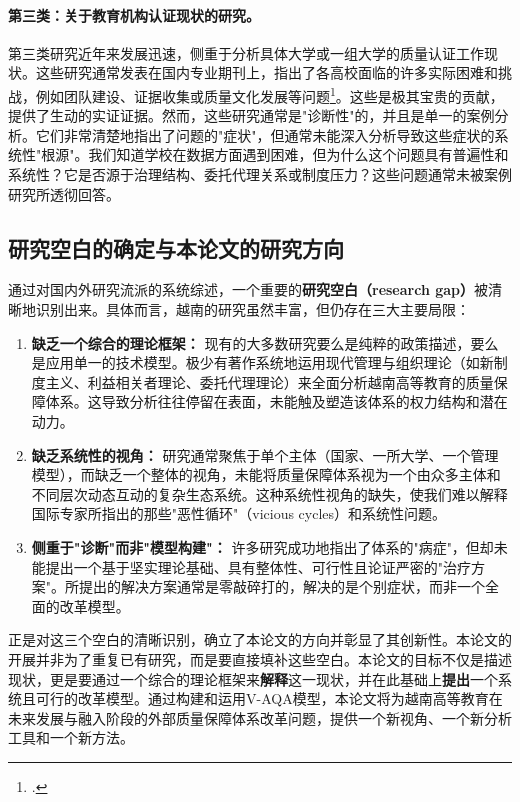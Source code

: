 \paragraph{第三类：关于教育机构认证现状的研究。}
第三类研究近年来发展迅速，侧重于分析具体大学或一组大学的质量认证工作现状。这些研究通常发表在国内专业期刊上，指出了各高校面临的许多实际困难和挑战，例如团队建设、证据收集或质量文化发展等问题\footcite{VJE_Challenges2023}。这些是极其宝贵的贡献，提供了生动的实证证据。然而，这些研究通常是"诊断性"的，并且是单一的案例分析。它们非常清楚地指出了问题的"症状"，但通常未能深入分析导致这些症状的系统性"根源"。我们知道学校在数据方面遇到困难，但为什么这个问题具有普遍性和系统性？它是否源于治理结构、委托代理关系或制度压力？这些问题通常未被案例研究所透彻回答。

\subsection{研究空白的确定与本论文的研究方向}
\label{subsec:xac_dinh_khoang_trong}

通过对国内外研究流派的系统综述，一个重要的\textbf{研究空白（research gap）}被清晰地识别出来。具体而言，越南的研究虽然丰富，但仍存在三大主要局限：
\begin{enumerate}
    \item \textbf{缺乏一个综合的理论框架：} 现有的大多数研究要么是纯粹的政策描述，要么是应用单一的技术模型。极少有著作系统地运用现代管理与组织理论（如新制度主义、利益相关者理论、委托代理理论）来全面分析越南高等教育的质量保障体系。这导致分析往往停留在表面，未能触及塑造该体系的权力结构和潜在动力。
    
    \item \textbf{缺乏系统性的视角：} 研究通常聚焦于单个主体（国家、一所大学、一个管理模型），而缺乏一个整体的视角，未能将质量保障体系视为一个由众多主体和不同层次动态互动的复杂生态系统。这种系统性视角的缺失，使我们难以解释国际专家所指出的那些"恶性循环"（vicious cycles）和系统性问题。
    
    \item \textbf{侧重于"诊断"而非"模型构建"：} 许多研究成功地指出了体系的"病症"，但却未能提出一个基于坚实理论基础、具有整体性、可行性且论证严密的"治疗方案"。所提出的解决方案通常是零敲碎打的，解决的是个别症状，而非一个全面的改革模型。
\end{enumerate}

正是对这三个空白的清晰识别，确立了本论文的方向并彰显了其创新性。本论文的开展并非为了重复已有研究，而是要直接填补这些空白。本论文的目标不仅是描述现状，更是要通过一个综合的理论框架来\textbf{解释}这一现状，并在此基础上\textbf{提出}一个系统且可行的改革模型。通过构建和运用V-AQA模型，本论文将为越南高等教育在未来发展与融入阶段的外部质量保障体系改革问题，提供一个新视角、一个新分析工具和一个新方法。


